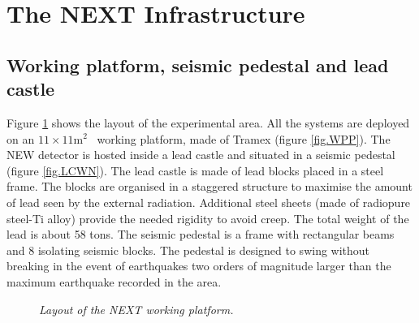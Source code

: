 \section{The NEXT Infrastructure}
\label{sec.infra}

\subsection{Working platform, seismic pedestal and lead castle}

Figure \ref{fig.WP} shows the layout of the experimental area. All the systems are deployed on an $11 \times 11 \mathrm{m^2}$~ working platform, made of Tramex (figure \ref{fig.WPP}). The NEW detector is hosted inside a lead castle and situated in a seismic pedestal (figure \ref{fig.LCWN}). The lead castle is made of lead blocks placed in a steel frame. The blocks are organised in a staggered structure to maximise the amount of lead seen by the external radiation. Additional steel sheets (made of radiopure steel-Ti alloy) provide the needed rigidity to avoid creep. The total weight of the lead is about 58 tons. 
The seismic pedestal is a frame with rectangular beams and 8 isolating seismic blocks. The pedestal is designed to swing without breaking in the event of earthquakes two orders of magnitude larger than the maximum earthquake recorded in the area. 


\begin{figure}[hpt!]
    \bigskip
    \begin{center}\leavevmode
        \caption{\textit{Layout of the NEXT working platform.}}
        \label{fig.WP}
    \end{center}
\end{figure}

